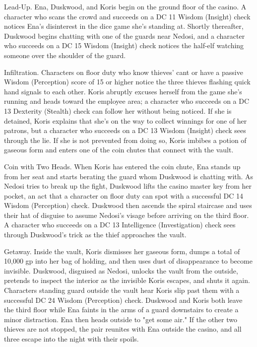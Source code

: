 \documentclass[10pt,a4paper,twoside,bg=print,twocolumn,openany,nodeprecatedcode]{dndbook}
\begin{document}
\begin{description}[nolistsep]
\item[Stage 1:]
Lead-Up. Ena, Duskwood, and Koris begin on the ground floor of the casino. A character who scans the crowd and succeeds on a DC 11 Wisdom (Insight) check notices Ena's disinterest in the dice game she's standing at. Shortly thereafter, Duskwood begins chatting with one of the guards near Nedosi, and a character who succeeds on a DC 15 Wisdom (Insight) check notices the half-elf watching someone over the shoulder of the guard.
\item[Stage 2:]
Infiltration. Characters on floor duty who know thieves' cant or have a passive Wisdom (Perception) score of 15 or higher notice the three thieves flashing quick hand signals to each other. Koris abruptly excuses herself from the game she's running and heads toward the employee area; a character who succeeds on a DC 13 Dexterity (Stealth) check can follow her without being noticed. If she is detained, Koris explains that she's on the way to collect winnings for one of her patrons, but a character who succeeds on a DC 13 Wisdom (Insight) check sees through the lie. If she is not prevented from doing so, Koris imbibes a potion of gaseous form and enters one of the coin chutes that connect with the vault.
\item[Stage 3:]
Coin with Two Heads. When Koris has entered the coin chute, Ena stands up from her seat and starts berating the guard whom Duskwood is chatting with. As Nedosi tries to break up the fight, Duskwood lifts the casino master key from her pocket, an act that a character on floor duty can spot with a successful DC 14 Wisdom (Perception) check. Duskwood then ascends the spiral staircase and uses their hat of disguise to assume Nedosi's visage before arriving on the third floor. A character who succeeds on a DC 13 Intelligence (Investigation) check sees through Duskwood's trick as the thief approaches the vault.

\item[Stage 4:]
Getaway. Inside the vault, Koris dismisses her gaseous form, dumps a total of 10,000 gp into her bag of holding, and then uses dust of disappearance to become invisible. Duskwood, disguised as Nedosi, unlocks the vault from the outside, pretends to inspect the interior as the invisible Koris escapes, and shuts it again. Characters standing guard outside the vault hear Koris slip past them with a successful DC 24 Wisdom (Perception) check. Duskwood and Koris both leave the third floor while Ena faints in the arms of a guard downstairs to create a minor distraction. Ena then heads outside to "get some air." If the other two thieves are not stopped, the pair reunites with Ena outside the casino, and all three escape into the night with their spoils.
\end{description}
\end{document}
